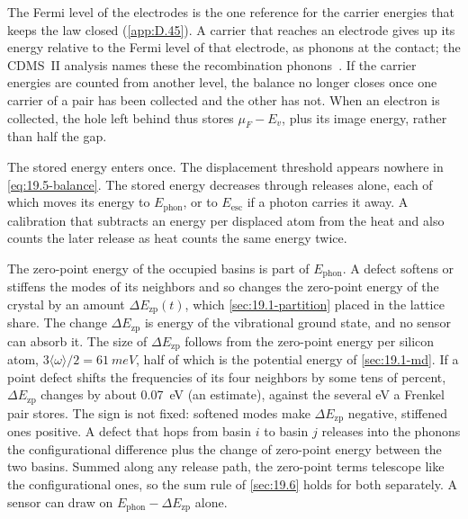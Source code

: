 The Fermi level of the electrodes is the one reference for the carrier energies that keeps the law closed (\cref{app:D.45}). A carrier that reaches an electrode gives up its energy relative to the Fermi level of that electrode, as phonons at the contact; the CDMS~II analysis names these the recombination phonons~\cite[Sect.~2]{agnese2018nuclear}. If the carrier energies are counted from another level, the balance no longer closes once one carrier of a pair has been collected and the other has not. When an electron is collected, the hole left behind thus stores $\mu_F - E_v$, plus its image energy, rather than half the gap.

The stored energy enters once. The displacement threshold appears nowhere in \cref{eq:19.5-balance}. The stored energy decreases through releases alone, each of which moves its energy to $E_{\mathrm{phon}}$, or to $E_{\mathrm{esc}}$ if a photon carries it away. A calibration that subtracts an energy per displaced atom from the heat and also counts the later release as heat counts the same energy twice.

The zero-point energy of the occupied basins is part of $E_{\mathrm{phon}}$. A defect softens or stiffens the modes of its neighbors and so changes the zero-point energy of the crystal by an amount $\Delta E_{\mathrm{zp}}(t)$, which \cref{sec:19.1-partition} placed in the lattice share. The change $\Delta E_{\mathrm{zp}}$ is energy of the vibrational ground state, and no sensor can absorb it. The size of $\Delta E_{\mathrm{zp}}$ follows from the zero-point energy per silicon atom, $3\langle\omega\rangle/2 = \SI{61}{meV}$, half of which is the potential energy of \cref{sec:19.1-md}. If a point defect shifts the frequencies of its four neighbors by some tens of percent, $\Delta E_{\mathrm{zp}}$ changes by about \SI{0.07}{eV} (an estimate), against the several eV a Frenkel pair stores. The sign is not fixed: softened modes make $\Delta E_{\mathrm{zp}}$ negative, stiffened ones positive. A defect that hops from basin $i$ to basin $j$ releases into the phonons the configurational difference plus the change of zero-point energy between the two basins. Summed along any release path, the zero-point terms telescope like the configurational ones, so the sum rule of \cref{sec:19.6} holds for both separately. A sensor can draw on $E_{\mathrm{phon}} - \Delta E_{\mathrm{zp}}$ alone.

